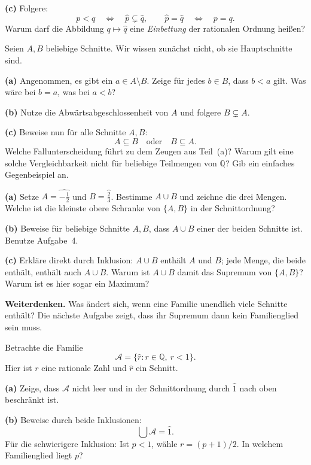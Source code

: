 \textbf{(c)} Folgere:
\[
 p<q\quad\Longleftrightarrow\quad
 \widehat p\subsetneq\widehat q,
 \qquad
 \widehat p=\widehat q\quad\Longleftrightarrow\quad p=q.
\]
Warum darf die Abbildung $q\mapsto\widehat q$ eine
\emph{Einbettung} der rationalen Ordnung heißen?

Seien $A,B$ beliebige Schnitte. Wir wissen zunächst nicht,
ob sie Hauptschnitte sind.

\textbf{(a)} Angenommen, es gibt ein $a\in A\setminus B$.
Zeige für jedes $b\in B$, dass $b<a$ gilt.
Was wäre bei $b=a$, was bei $a<b$?

\textbf{(b)} Nutze die Abwärtsabgeschlossenheit von $A$ und
folgere $B\subsetneq A$.

\textbf{(c)} Beweise nun für alle Schnitte $A,B$:
\[
 A\subseteq B\quad\text{oder}\quad B\subseteq A.
\]
Welche Fallunterscheidung führt zu dem Zeugen aus Teil~(a)?
Warum gilt eine solche Vergleichbarkeit nicht für beliebige
Teilmengen von $\mathbb Q$? Gib ein einfaches Gegenbeispiel an.

\textbf{(a)} Setze
$A=\widehat{-\frac12}$ und $B=\widehat{\frac23}$.
Bestimme $A\cup B$ und zeichne die drei Mengen.
Welche ist die kleinste obere Schranke von $\{A,B\}$
in der Schnittordnung?

\textbf{(b)} Beweise für beliebige Schnitte $A,B$, dass
$A\cup B$ einer der beiden Schnitte ist.
Benutze Aufgabe~4.

\textbf{(c)} Erkläre direkt durch Inklusion:
$A\cup B$ enthält $A$ und $B$; jede Menge, die beide enthält,
enthält auch $A\cup B$.
Warum ist $A\cup B$ damit das Supremum von $\{A,B\}$?
Warum ist es hier sogar ein Maximum?

\textbf{Weiterdenken.} Was ändert sich, wenn eine Familie
unendlich viele Schnitte enthält? Die nächste Aufgabe zeigt,
dass ihr Supremum dann kein Familienglied sein muss.

Betrachte die Familie
\[
 \mathcal A=\{\widehat r:r\in\mathbb Q,\ r<1\}.
\]
Hier ist $r$ eine rationale Zahl und $\widehat r$ ein Schnitt.

\textbf{(a)} Zeige, dass $\mathcal A$ nicht leer und in der
Schnittordnung durch $\widehat1$ nach oben beschränkt ist.

\textbf{(b)} Beweise durch beide Inklusionen:
\[
 \bigcup\mathcal A=\widehat1.
\]
Für die schwierigere Inklusion: Ist $p<1$, wähle
$r=(p+1)/2$. In welchem Familienglied liegt $p$?

